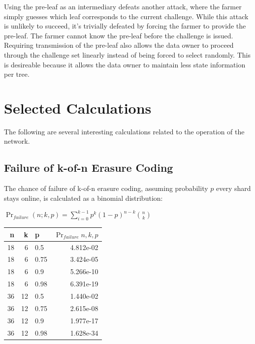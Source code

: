 \documentclass[a4paper,10pt]{article}
\begin{document}
Using the pre-leaf as an intermediary defeats another attack, where the farmer simply guesses which leaf corresponds to the current challenge. While this attack is unlikely to succeed, it’s trivially defeated by forcing the farmer to provide the pre-leaf. The farmer cannot know the pre-leaf before the challenge is issued. Requiring transmission of the pre-leaf also allows the data owner to proceed through the challenge set linearly instead of being forced to select randomly. This is desireable because it allows the data owner to maintain less state information per tree.

\section{Selected Calculations}
The following are several interesting calculations related to the operation of the network.

\subsection{Failure of k-of-n Erasure Coding}
The chance of failure of k-of-n erasure coding, assuming probability $ p $ every shard stays online, is calculated as a binomial distribution:

{\centering
$\Pr_{failure}(n; k,p) = \displaystyle \sum_{i=0}^{k-1} p^{k}(1-p)^{n-k }{n \choose k}$
\\}

\begin{table}[hbt!]
\begin{center}
\begin{tabular}{r r l r}
n & k & p & $\Pr_{failure}{n,k,p}$\\
\hline  18 & 6  &  0.5  & 4.812e-02\\
\hline  18 & 6  &  0.75 &3.424e-05\\
\hline  18 & 6  &  0.9  & 5.266e-10\\
\hline  18 & 6  &  0.98 &6.391e-19\\
\hline  36 & 12 &  0.5  &1.440e-02\\
\hline  36 & 12 &  0.75 &2.615e-08\\
\hline  36 & 12 &  0.9  &1.977e-17\\
\hline  36 & 12 &  0.98 &1.628e-34\\
\end{tabular}
\end{center}
\end{table}
\end{document}
